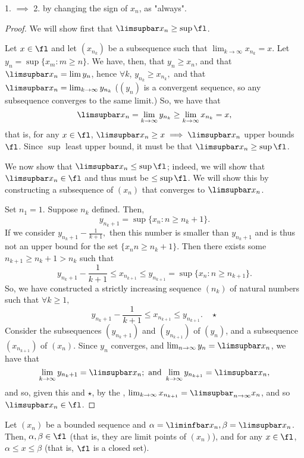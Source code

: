 \documentclass[12pt]{article}
\begin{document}
\begin{remark}
  1. $\implies$ 2. by changing the sign of $x_n$, as "always".
\end{remark}

\begin{proof}
  We will show first that $\limsupbar x_n \geq \sup \fl$.

  Let $x \in \fl$ and let $(x_{n_k})$ be a subsequence such that $\lim_{k\to\infty} x_{n_k} = x$. Let $y_n = \sup \{x_{m}: m \geq n\}$. We have, then, that $y_n \geq x_n$, and that $\limsupbar x_{n} = \lim y_n$, hence $\forall k$, $y_{n_k} \geq x_{n_k},$ and that $\limsupbar x_n = \lim_{k\to\infty} y_{n_k}$ ($(y_n)$ is a convergent sequence, so any subsequence converges to the same limit.) So, we have that $$\limsupbar x_n = \lim_{k\to\infty} y_{n_k} \geq \lim_{k\to\infty} x_{n_k} = x,$$ that is, for any $x \in \fl$, $\limsupbar x_n  \geq x \implies \limsupbar x_n$ upper bounds $\fl$. Since $\sup$ least upper bound, it must be that $\limsupbar x_n \geq \sup \fl$.

  We now show that $\limsupbar x_n \leq \sup \fl$; indeed, we will show that $\limsupbar x_n \in \fl$ and thus must be $\leq \sup \fl$. We will show this by constructing a subsequence of $(x_n)$ that converges to $\limsupbar x_n$.

  Set $n_1 = 1$. Suppose $n_k$ defined. Then, \[
  y_{n_k + 1} = \sup \{x_n : n \geq n_k + 1\}.  
  \]
  If we consider $y_{n_k + 1} - \frac{1}{k+1},$ then this number is smaller than $y_{n_k + 1}$ and is thus not an upper bound for the set $\{x_n n \geq n_k + 1\}.$ Then there exists some $n_{k+1} \geq n_k + 1 > n_k$ such that \[
  y_{n_k + 1} - \frac{1}{k+1} \leq x_{n_{k+1}}   \leq y_{n_{k+1}} = \sup \{x_n : n \geq n_{k+1}\}.
  \]
  So, we have constructed a strictly increasing sequence $(n_k)$ of natural numbers such that $\forall k\geq 1,$ $$y_{n_k+1} - \frac{1}{k+1} \leq x_{n_{k+1}} \leq y_{n_{k+1}}. \quad \star$$ Consider the subsequences $(y_{n_k + 1})$ and $(y_{n_{k+1}})$ of $(y_n)$, and a subsequence $(x_{n_{k+1}})$ of $(x_n)$. Since $y_n$ converges, and $\lim_{n\to\infty} y_n = \limsupbar x_n$, we have that \[
    \lim_{k\to\infty} y_{n_k + 1} = \limsupbar x_n; \text{ and } \lim_{k\to\infty} y_{n_{k+1}} = \limsupbar x_n,
    \]
    and so, given this and $\star$, by the ,  $\lim_{k\to\infty} x_{n_{k+1}} = \limsupbar_{n\to\infty} x_n$, and so $\limsupbar x_n \in \fl$.
\end{proof}

\begin{corollary}
  Let $(x_n)$ be a bounded sequence and $\alpha = \liminfbar x_n, \beta = \limsupbar x_n$. Then, $\alpha, \beta \in \fl$ (that is, they are limit points of $(x_n)$), and for any $x \in \fl$, $\alpha \leq x \leq \beta$ (that is, $\fl$ is a closed set).
\end{corollary}
\end{document}
